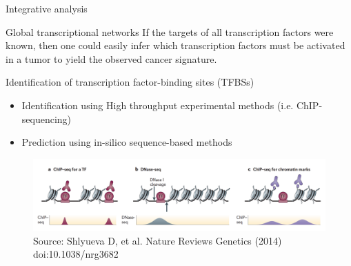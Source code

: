 \documentclass[slidestop,compress,11pt,xcolor=dvipsnames]{beamer}
\begin{document}
\begin{frame}{Integrative analysis}
 \vspace*{-0.3cm}
\begin{block}{Global transcriptional networks}
If the targets of all transcription factors were known, then one could easily infer which transcription factors must be activated in a tumor to yield the observed cancer signature.
\end{block}
\begin{exampleblock}{ Identification of transcription factor-binding sites (TFBSs)}
\begin{itemize}
     \item Identification using High throughput experimental methods (i.e. ChIP-sequencing)
     \item Prediction using in-silico sequence-based methods
\end{itemize}
\end{exampleblock}
\vspace*{-0.3cm}
\begin{figure}
 \centering
 \includegraphics[width=1.0\linewidth]{intro/TF.png}{\tiny{\\Source: Shlyueva D, et al. Nature Reviews Genetics  (2014) doi:10.1038/nrg3682}}
\end{figure}
\end{frame}
\end{document}

